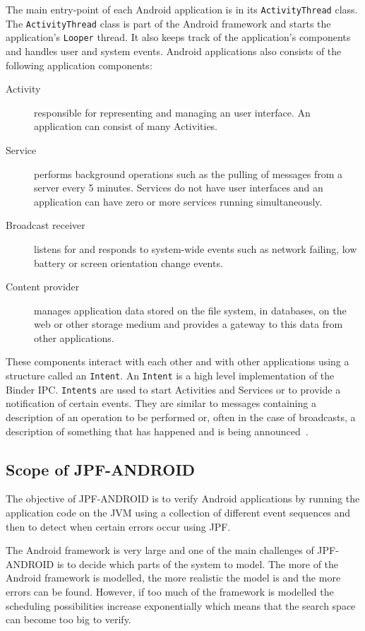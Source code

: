 \documentclass{acm_proc_article-sp}
\begin{document}
The main entry-point of each Android application is in its \texttt{ActivityThread} class. The \texttt{ActivityThread} class is part of the
Android framework and starts the application's \texttt{Looper} thread. It also keeps track of the application's components and handles user
and system events. Android applications also consists of the following application components:
\vspace{-10pt}
\begin{description}
\item [Activity] responsible for representing and managing an user interface. An application can consist of many
Activities.
\item [Service] performs background operations such as the pulling of messages from a server every 5 minutes. Services do not have user
interfaces and an application can have zero or more services running simultaneously.
\item [Broadcast receiver] listens for and responds to system-wide events such as network failing, low battery or screen orientation
change events.
\item [Content provider] manages application data stored on the file system, in databases, on the web or other storage medium and provides a
gateway to this data from other applications.
\end{description}
\vspace{-5pt}
These components interact with each other and with other applications using a structure called an \texttt{Intent}. An \texttt{Intent} is a
high level implementation of the Binder IPC. \texttt{Intents} are used to start Activities and Services or to provide a notification of
certain events. They are similar to messages containing a description of an operation to be performed or, often in the case of broadcasts, a
description of something that has happened and is being announced~\cite{AndroidDocs}.

\subsection{Scope of JPF-ANDROID}
The objective of JPF-ANDROID is to verify Android applications by running the application code on the JVM using a collection of different
event sequences and then to detect when certain errors occur using JPF.

The Android framework is very large and one of the main challenges of JPF-ANDROID is to decide which parts of the system to model. The more
of the Android framework is modelled, the more realistic the model is and the more errors can be found. However, if too much
of the framework is modelled the scheduling possibilities increase exponentially which means that the search space can become too big to
verify.
\end{document}
